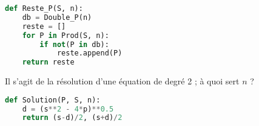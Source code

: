 \begin{Exercise}
\begin{lstlisting}[language=python]
def Reste_P(S, n):
    db = Double_P(n)
    reste = []
    for P in Prod(S, n):
        if not(P in db):
            reste.append(P)
    return reste    
\end{lstlisting}
\end{Exercise}
\begin{Exercise}
Il s'agit de la résolution d'une équation de degré 2 ; à quoi sert $n$ ?


\begin{lstlisting}[language=python]
def Solution(P, S, n):
    d = (s**2 - 4*p)**0.5
    return (s-d)/2, (s+d)/2
\end{lstlisting}
\end{Exercise}

